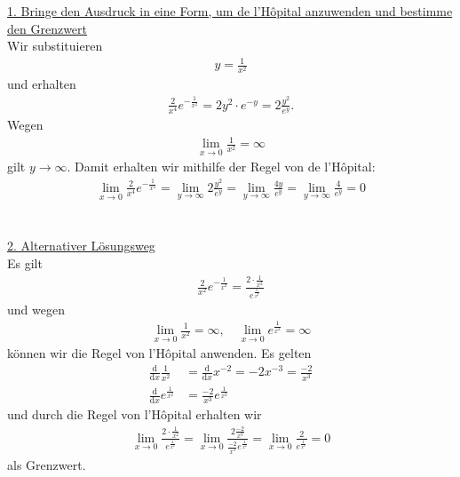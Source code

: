 \underline{1. Bringe den Ausdruck in eine Form, um de l'H\^{o}pital anzuwenden und bestimme den Grenzwert}\\
Wir substituieren 
\begin{align*}
y = \frac{1}{x^2}
\end{align*}
und erhalten 
\begin{align*}
\frac{2}{x^4} e^{- \frac{1}{x^2}}
=2 y^2 \cdot e^{-y}
= 2 \frac{y^2}{e^{y}}.
\end{align*}
Wegen 
\begin{align*}
\lim \limits_{x \to 0} \frac{1}{x^2} = \infty
\end{align*}
gilt $ y \to \infty $.
Damit erhalten wir mithilfe der Regel von de l'H\^{o}pital:
\begin{align*}
\lim \limits_{x \to 0} \frac{2}{x^4} e^{- \frac{1}{x^2}}
=
\lim \limits_{y \to \infty} 2 \frac{y^2}{e^{y}}
=
\lim \limits_{y \to \infty} \frac{4y}{e^{y}}
=
\lim \limits_{y \to \infty}  \frac{4}{e^{y}} = 0
\end{align*}
\\
\\
\underline{2. Alternativer Lösungsweg}\\
Es gilt
\begin{align*}
\frac{2}{x^2} e^{-\frac{1}{x^2}}
=
\frac{2 \cdot \frac{1}{x^2}}{e^{\frac{1}{x^2}}}
\end{align*}
und wegen 
\begin{align*}
\lim \limits_{x \to 0 } \frac{1}{x^2} = \infty, \quad
\lim \limits_{x \to 0 } e^{\frac{1}{x^2}} = \infty
\end{align*}
können wir die Regel von l'H\^{o}pital anwenden.
Es gelten
\begin{align*}
\frac{\mathrm{d}}{\mathrm{d} x} \frac{1}{x^2}
&=
\frac{\mathrm{d}}{\mathrm{d} x} x^{-2} 
=
-2 x^{-3} = \frac{-2}{x^3}\\
\frac{\mathrm{d}}{\mathrm{d} x} e^{\frac{1}{x^2}}
&=
\frac{-2}{x^3} e^{\frac{1}{x^2}} 
\end{align*}
und durch die Regel von l'H\^{o}pital erhalten wir
\begin{align*}
\lim \limits_{x \to 0 } \frac{2 \cdot \frac{1}{x^2}}{e^{\frac{1}{x^2}}}
=
\lim \limits_{x \to 0 } \frac{2 \frac{-2}{x^3}}{\frac{-2}{x^3} e^{\frac{1}{x^2}}}
= 
\lim \limits_{x \to 0} \frac{2}{e^{\frac{1}{x^2}}} = 0
\end{align*}
als Grenzwert.\\
\\

\newpage
